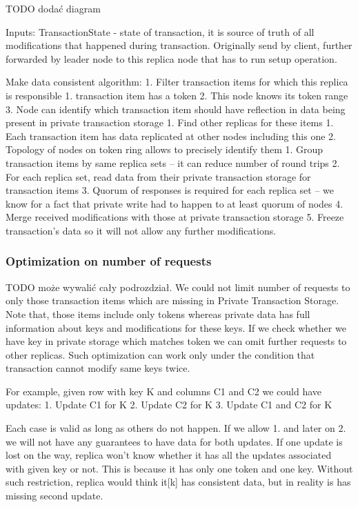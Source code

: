 TODO dodać diagram

Inputs:
        TransactionState - state of transaction, it is source of truth of all modifications that happened during transaction. Originally send by client, further forwarded by leader node to this replica node that has to run setup operation.


        Make data consistent algorithm:        
1. Filter transaction items for which this replica is responsible
   1. transaction item has a token
   2. This node knows its token range
   3. Node can identify which transaction item should have reflection in data being present in private transaction storage
1. Find other replicas for these items
   1. Each transaction item has data replicated at other nodes including this one
   2. Topology of nodes on token ring allows to precisely identify them
1. Group transaction items by same replica sets -- it can reduce number of round trips
2. For each replica set, read data from their private transaction storage for transaction items
3. Quorum of responses is required for each replica set -- we know for a fact that private write had to happen to at least quorum of nodes
4. Merge received modifications with those at private transaction storage
5. Freeze transaction’s data so it will not allow any further modifications.


\subsubsection{Optimization on number of requests}
TODO może wywalić cały podrozdział.
We could not limit number of requests to only those transaction items which are missing in Private Transaction Storage. Note that, those items include only tokens whereas private data has full information about keys and modifications for these keys. If we check whether we have key in private storage which matches token we can omit further requests to other replicas. 
Such optimization can work only under the condition that transaction cannot modify same keys twice. 


For example, given row with key K and columns C1 and C2 we could have updates:
1. Update C1 for K
2. Update C2 for K
3. Update C1 and C2 for K


Each case is valid as long as others do not happen. If we allow 1. and later on 2. we will not have any guarantees to have data for both updates. If one update is lost on the way, replica won’t know whether it has all the updates associated with given key or not. This is because it has only one token and one key. 
Without such restriction, replica would think it[k] has consistent data, but in reality is has missing second update.

